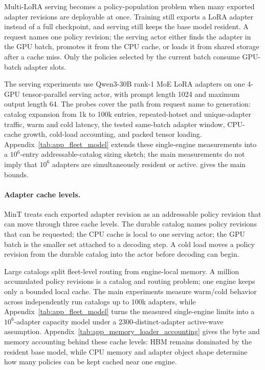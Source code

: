 Multi-LoRA serving becomes a policy-population problem when many exported adapter revisions are deployable at once. Training still exports a LoRA adapter instead of a full checkpoint, and serving still keeps the base model resident. A request names one policy revision; the serving actor either finds the adapter in the GPU batch, promotes it from the CPU cache, or loads it from shared storage after a cache miss. Only the policies selected by the current batch consume GPU-batch adapter slots.

The serving experiments use Qwen3-30B rank-1 MoE LoRA adapters on one 4-GPU tensor-parallel serving actor, with prompt length 1024 and maximum output length 64. The probes cover the path from request name to generation: catalog expansion from 1k to 100k entries, repeated-hotset and unique-adapter traffic, warm and cold latency, the tested same-batch adapter window, CPU-cache growth, cold-load accounting, and packed tensor loading. Appendix~\cref{tab:app_fleet_model} extends these single-engine measurements into a $10^6$-entry addressable-catalog sizing sketch; the main measurements do not imply that $10^6$ adapters are simultaneously resident or active.  gives the main bounds.

\paragraph{Adapter cache levels.}
MinT treats each exported adapter revision as an addressable policy revision that can move through three cache levels. The durable catalog names policy revisions that can be requested; the CPU cache is local to one serving actor; the GPU batch is the smaller set attached to a decoding step. A cold load moves a policy revision from the durable catalog into the actor before decoding can begin.

Large catalogs split fleet-level routing from engine-local memory. A million accumulated policy revisions is a catalog and routing problem; one engine keeps only a bounded local cache. The main experiments measure warm/cold behavior across independently run catalogs up to 100k adapters, while Appendix~\cref{tab:app_fleet_model} turns the measured single-engine limits into a $10^6$-adapter capacity model under a 2300-distinct-adapter active-wave assumption. Appendix~\cref{tab:app_memory_loader_accounting} gives the byte and memory accounting behind these cache levels: HBM remains dominated by the resident base model, while CPU memory and adapter object shape determine how many policies can be kept cached near one engine.

